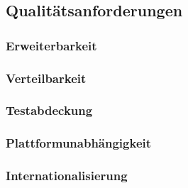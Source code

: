 \subsection{Qualitätsanforderungen}
\subsubsection{Erweiterbarkeit}
\subsubsection{Verteilbarkeit}
\subsubsection{Testabdeckung}
\subsubsection{Plattformunabhängigkeit}\label{req_plattformunabhaengig}
\subsubsection{Internationalisierung}


